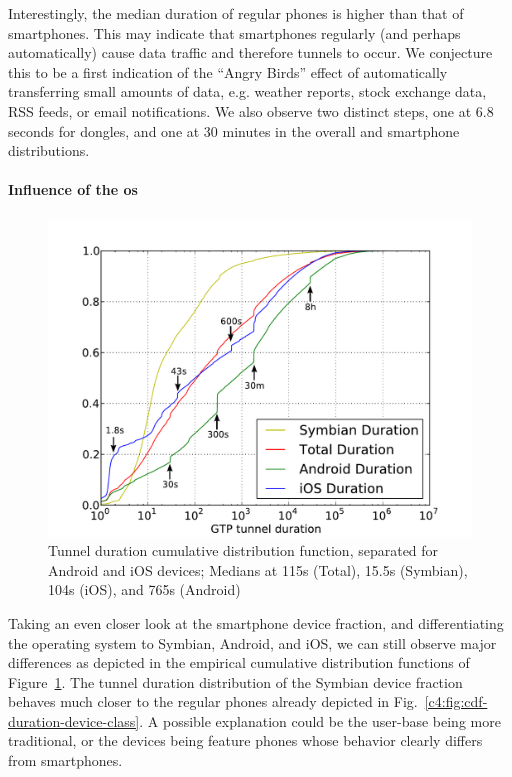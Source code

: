 Interestingly, the median duration of regular phones is higher than that of smartphones. This may indicate that smartphones regularly (and perhaps automatically) cause data traffic and therefore tunnels to occur. We conjecture this to be a first indication of the ``Angry Birds'' effect of automatically transferring small amounts of data, e.g. weather reports, stock exchange data, RSS feeds, or email notifications. We also observe two distinct steps, one at 6.8 seconds for dongles, and one at 30 minutes in the overall and smartphone distributions.


\paragraph{Influence of the \texorpdfstring{\acrshort{os}}{OS}}

\begin{figure}[htb]
    \centering
    \includegraphics[width=1.0\textwidth]{images/tunnel-dur-os-cdf-mod.pdf}
    \caption{Tunnel duration cumulative distribution function, separated for Android and iOS devices; Medians at 115s (Total), 15.5s (Symbian), 104s (iOS), and 765s (Android)}
    \label{c4:fig:cdf-duration-os}
\end{figure}

Taking an even closer look at the smartphone device fraction, and differentiating the operating system to Symbian, Android, and iOS, we can still observe major differences as depicted in the empirical cumulative distribution functions of Figure~\ref{c4:fig:cdf-duration-os}. The tunnel duration distribution of the Symbian device fraction behaves much closer to the regular phones already depicted in Fig.~\ref{c4:fig:cdf-duration-device-class}. A possible explanation could be the user-base being more traditional, or the devices being feature phones whose behavior clearly differs from smartphones.

